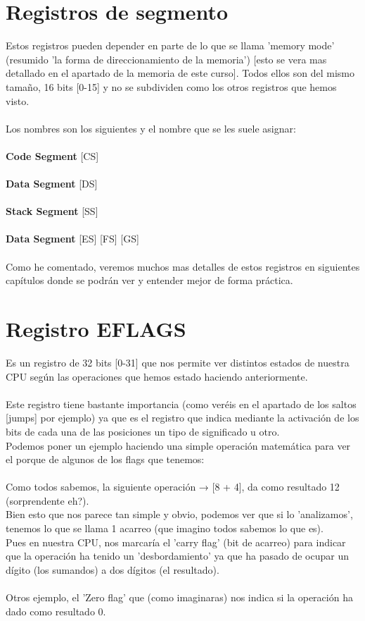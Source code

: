\documentclass{fennix}
\begin{document}
\newpage
\section{Registros de segmento}
Estos registros pueden depender en parte de lo que se llama 'memory mode' (resumido 'la forma de direccionamiento de la memoria') [esto se vera mas detallado en el apartado de la memoria de este curso].
Todos ellos son del mismo tamaño, 16 bits [0-15] y no se subdividen como los otros registros que hemos visto.\\
\\
Los nombres son los siguientes y el nombre que se les suele asignar:\\
\\
\textbf{Code Segment} [CS]\\
\\
\textbf{Data Segment} [DS]\\
\\
\textbf{Stack Segment} [SS]\\
\\
\textbf{Data Segment} [ES] [FS] [GS]\\
\\
Como he comentado, veremos muchos mas detalles de estos registros en siguientes capítulos donde se podrán ver y entender mejor de forma práctica.\\

\section{Registro EFLAGS}
Es un registro de 32 bits [0-31] que nos permite ver distintos estados de nuestra CPU según las operaciones que hemos estado haciendo anteriormente.\\
\\
Este registro tiene bastante importancia (como veréis en el apartado de los saltos [jumps] por ejemplo) ya que es el registro que indica mediante la activación de los bits de cada una de las posiciones un tipo de significado u otro.\\
Podemos poner un ejemplo haciendo una simple operación matemática para ver el porque de algunos de los flags que tenemos:\\
\\
Como todos sabemos, la siguiente operación → [8 + 4], da como resultado 12 (sorprendente eh?).\\
Bien esto que nos parece tan simple y obvio, podemos ver que si lo 'analizamos', tenemos lo que se llama 1 acarreo (que imagino todos sabemos lo que es).\\
Pues en nuestra CPU, nos marcaría el 'carry flag' (bit de acarreo) para indicar que la operación ha tenido un 'desbordamiento' ya que ha pasado de ocupar un dígito (los sumandos) a dos dígitos (el resultado).\\
\\
Otros ejemplo, el 'Zero flag' que (como imaginaras) nos indica si la operación ha dado como resultado 0.\\
\end{document}
